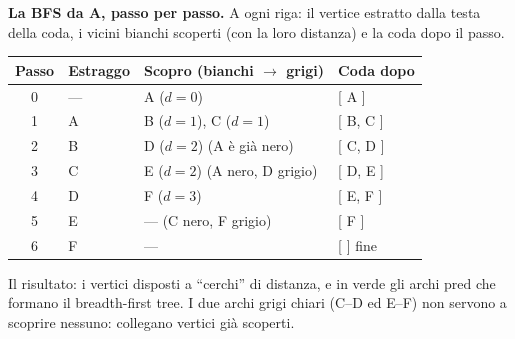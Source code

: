 \needspace{8cm}
\textbf{La BFS da A, passo per passo.} A ogni riga: il vertice estratto dalla testa
della coda, i vicini bianchi scoperti (con la loro distanza) e la coda dopo il passo.
\begin{center}
\begin{tabular}{clll}
\toprule
\textbf{Passo} & \textbf{Estraggo} & \textbf{Scopro (bianchi $\to$ grigi)} & \textbf{Coda dopo} \\
\midrule
0 & --- & A ($d=0$)                & [ A ] \\
1 & A   & B ($d=1$), C ($d=1$)     & [ B, C ] \\
2 & B   & D ($d=2$) \quad (A è già nero) & [ C, D ] \\
3 & C   & E ($d=2$) \quad (A nero, D grigio) & [ D, E ] \\
4 & D   & F ($d=3$)                & [ E, F ] \\
5 & E   & --- \quad (C nero, F grigio) & [ F ] \\
6 & F   & ---                      & [ ] fine \\
\bottomrule
\end{tabular}
\end{center}
Il risultato: i vertici disposti a ``cerchi'' di distanza, e in verde gli archi
$\text{pred}$ che formano il breadth-first tree. I due archi grigi chiari (C--D ed E--F)
non servono a scoprire nessuno: collegano vertici già scoperti.
\begin{center}
\end{center}

